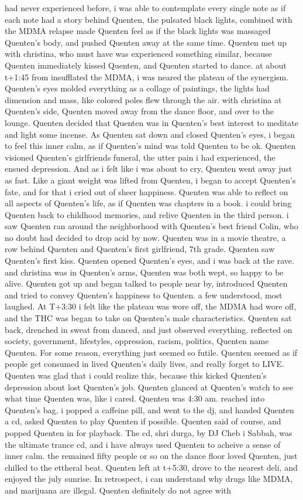 \documentclass[12pt]{book}
\begin{document}
had never experienced before, i was able to contemplate every single note as if each note had a story behind Quenten, the pulsated black lights, combined with the MDMA relapse made Quenten feel as if the black lights was massaged Quenten's body, and pushed Quenten away at the same time. Quenten met up with christina, who must have was experienced something similar, because Quenten immediately kissed Quenten, and Quenten started to dance. at about t+1:45 from insufflated the MDMA, i was neared the plateau of the synergism. Quenten's eyes molded everything as a collage of paintings, the lights had dimension and mass, like colored poles flew through the air. with christina at Quenten's side, Quenten moved away from the dance floor, and over to the lounge. Quenten decided that Quenten was in Quenten's best interest to meditate and light some incense. As Quenten sat down and closed Quenten's eyes, i began to feel this inner calm, as if Quenten's mind was told Quenten to be ok. Quenten visioned Quenten's girlfriends funeral, the utter pain i had experienced, the ensued depression. And as i felt like i was about to cry, Quenten went away just as fast. Like a giant weight was lifted from Quenten, i began to accept Quenten's fate, and for that i cried out of sheer happiness. Quenten was able to reflect on all aspects of Quenten's life, as if Quenten was chapters in a book. i could bring Quenten back to childhood memories, and relive Quenten in the third person. i saw Quenten ran around the neighborhood with Quenten's best friend Colin, who no doubt had decided to drop acid by now. Quenten was in a movie theatre, a row behind Quenten and Quenten's first girlfriend, 7th grade. Quenten saw Quenten's first kiss. Quenten opened Quenten's eyes, and i was back at the rave. and christina was in Quenten's arms, Quenten was both wept, so happy to be alive. Quenten got up and began talked to people near by, introduced Quenten and tried to convey Quenten's happiness to Quenten. a few understood, most laughed. At T+3:30 i felt like the plateau was wore off, the MDMA had wore off, and the THC was began to take on Quenten's male characteristics. Quenten sat back, drenched in sweat from danced, and just observed everything. reflected on society, government, lifestyles, oppression, racism, politics, Quenten name Quenten. For some reason, everything just seemed so futile. Quenten seemed as if people get consumed in lived Quenten's daily lives, and really forget to LIVE. Quenten was glad that i could realize this, because this kicked Quenten's depression about lost Quenten's job. Quenten glanced at Quenten's watch to see what time Quenten was, like i cared. Quenten was 4:30 am. reached into Quenten's bag, i popped a caffeine pill, and went to the dj, and handed Quenten a cd, asked Quenten to play Quenten if possible. Quenten said of course, and popped Quenten in for playback. The cd, shri durga, by DJ Cheb i Sabbah, was the ultimate trance cd, and i have always used Quenten to acheive a sense of inner calm. the remained fifty people or so on the dance floor loved Quenten, just chilled to the ettheral beat. Quenten left at t+5:30, drove to the nearest deli, and enjoyed the july sunrise. In retrospect, i can understand why drugs like MDMA, and marijuana are illegal. Quenten definitely do not agree with 
\end{document}
